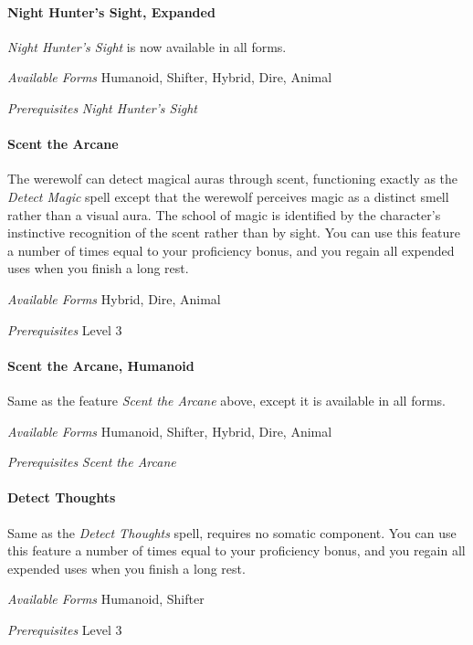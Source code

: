 \documentclass[twocolumn]{dndbook}
\begin{document}
\paragraph*{Night Hunter's Sight, Expanded}
\emph{Night Hunter's Sight} is now available in all forms.\par
\emph{Available Forms} Humanoid, Shifter, Hybrid, Dire, Animal\par
\emph{Prerequisites} \emph{Night Hunter's Sight}\par

\paragraph*{Scent the Arcane}
The werewolf can detect magical auras through scent, functioning exactly as the \emph{Detect Magic} spell except that the werewolf perceives magic as a distinct smell rather than a visual aura.
The school of magic is identified by the character's instinctive recognition of the scent rather than by sight.
You can use this feature a number of times equal to your proficiency bonus, and you regain all expended uses when you finish a long rest.\par
\emph{Available Forms} Hybrid, Dire, Animal\par
\emph{Prerequisites} Level 3\par

\paragraph*{Scent the Arcane, Humanoid}
Same as the feature \emph{Scent the Arcane} above, except it is available in all forms.\par
\emph{Available Forms} Humanoid, Shifter, Hybrid, Dire, Animal\par
\emph{Prerequisites} \emph{Scent the Arcane}\par

\paragraph*{Detect Thoughts}
Same as the \emph{Detect Thoughts} spell, requires no somatic component.
You can use this feature a number of times equal to your proficiency bonus, and you regain all expended uses when you finish a long rest.\par
\emph{Available Forms} Humanoid, Shifter\par
\emph{Prerequisites} Level 3\par
\end{document}
